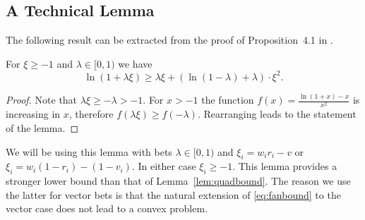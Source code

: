 \subsection{A Technical Lemma}
\label{app:fan}
The following result can be extracted from the proof of 
Proposition~4.1 in \cite{fan2015exponential}.
\begin{lemma}
For $\xi\geq -1$ and $\lambda \in [0,1)$ we have
\begin{equation}
\ln(1+\lambda \xi) \geq \lambda \xi+\left(\ln\left(1-\lambda\right)+\lambda\right)\cdot \xi^{2}.
\label{eq:fanbound}
\end{equation}
\end{lemma}
\begin{proof}
Note that $\lambda \xi \geq -\lambda > -1$. 
For $x>-1$ the function $f(x) = \frac{\ln(1 + x)-x}{x^2}$
is increasing in $x$, therefore
$f(\lambda \xi) \geq f(-\lambda)$. Rearranging
leads to the statement of the lemma.
\end{proof}
We will be using this lemma with bets 
$\lambda \in [0,1)$ and $\xi_i=w_ir_i-v$ or $\xi_i=w_i(1-r_i)-(1-v_i)$.
In either case $\xi_i\geq -1$.
This lemma provides a stronger lower bound than 
that of Lemma~\ref{lem:quadbound}. The reason
we use the latter for vector bets is that the
natural extension of \eqref{eq:fanbound} to 
the vector case does not lead to a convex 
problem. 

